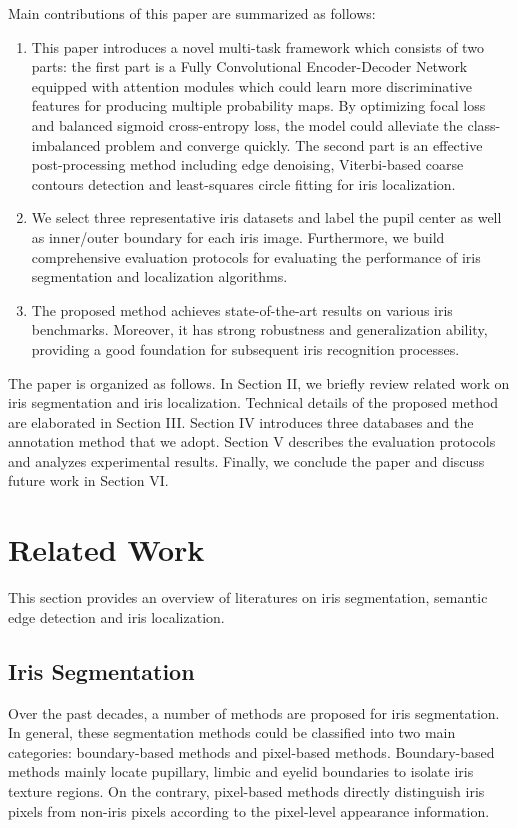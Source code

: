 \documentclass[journal]{IEEEtran}
\begin{document}
Main contributions of this paper are summarized as follows:

\begin{enumerate}
\item  This paper introduces a novel multi-task framework which consists of two parts: the first part is a Fully Convolutional Encoder-Decoder Network equipped with attention modules which could learn more discriminative features for producing multiple probability maps. By optimizing focal loss\cite{lin2017focal} and balanced sigmoid cross-entropy loss\cite{xie2015hed}, the model could alleviate the class-imbalanced problem and converge quickly. The second part is an effective post-processing method including edge denoising, Viterbi-based coarse contours detection\cite{Sutra2012The} and least-squares circle fitting\cite{chernov2005least} for iris localization.
\item  We select three representative iris datasets and label the pupil center as well as inner/outer boundary for each iris image. Furthermore, we build comprehensive evaluation protocols for evaluating the performance of iris segmentation and localization algorithms.
\item  The proposed method achieves state-of-the-art results on various iris benchmarks. Moreover, it has strong robustness and generalization ability, providing a good foundation for subsequent iris recognition processes.
\end{enumerate}

The  paper is organized as follows. In Section II, we briefly review related work on iris segmentation and iris localization. Technical details of the proposed method are elaborated in Section III. Section IV introduces three databases and the annotation method that we adopt. Section V describes the evaluation protocols and analyzes experimental results. Finally, we conclude the paper and discuss future work in Section VI.

\section{Related Work}
This section provides an overview of literatures on iris segmentation, semantic edge detection and iris localization.

\subsection{Iris Segmentation}
\label{segsection}
Over the past decades, a number of methods are proposed for iris segmentation. In general, these segmentation methods could be classified into two main categories: boundary-based methods and pixel-based methods\cite{liu2016accurate}. Boundary-based methods mainly locate pupillary, limbic and eyelid boundaries to isolate iris texture regions. On the contrary, pixel-based methods directly distinguish iris pixels from non-iris pixels according to the pixel-level appearance information.
\end{document}
